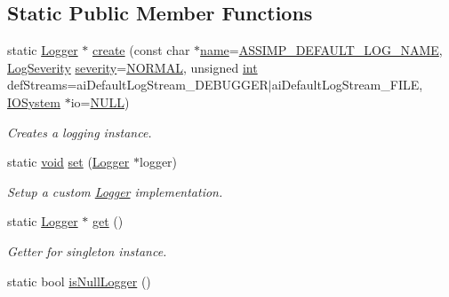 \subsection*{Static Public Member Functions}
\begin{DoxyCompactItemize}
\item 
static \hyperlink{class_assimp_1_1_logger}{Logger} $\ast$ \hyperlink{class_assimp_1_1_default_logger_adccb11f85f8b0ef226c382e11ba665c3}{create} (const char $\ast$\hyperlink{_g_l_e_w_2glew_8h_aaced7cfc21e7d37775d6921bb8177239}{name}=\hyperlink{_default_logger_8hpp_a5e31e6d6c9f8a8954134f3da38fec0a0}{A\-S\-S\-I\-M\-P\-\_\-\-D\-E\-F\-A\-U\-L\-T\-\_\-\-L\-O\-G\-\_\-\-N\-A\-M\-E}, \hyperlink{class_assimp_1_1_logger_a8b6248a0fd062431e8572556350d29e6}{Log\-Severity} \hyperlink{_g_l_e_w_2glew_8h_aa9ef9fc6186ec914a859436da4764bca}{severity}=\hyperlink{class_assimp_1_1_logger_a8b6248a0fd062431e8572556350d29e6a79d16f85dc21486ee489f300027e8eda}{N\-O\-R\-M\-A\-L}, unsigned \hyperlink{_s_d_l__thread_8h_a6a64f9be4433e4de6e2f2f548cf3c08e}{int} def\-Streams=ai\-Default\-Log\-Stream\-\_\-\-D\-E\-B\-U\-G\-G\-E\-R$|$ai\-Default\-Log\-Stream\-\_\-\-F\-I\-L\-E, \hyperlink{class_assimp_1_1_i_o_system}{I\-O\-System} $\ast$io=\hyperlink{begin__code_8h_a070d2ce7b6bb7e5c05602aa8c308d0c4}{N\-U\-L\-L})
\begin{DoxyCompactList}\small\item\em Creates a logging instance. \end{DoxyCompactList}\item 
static \hyperlink{_s_d_l__opengl_8h_a3db05964a3cc4410f35b7ea2b7eb850d}{void} \hyperlink{class_assimp_1_1_default_logger_a9daba548026045b99813c760c2842ed2}{set} (\hyperlink{class_assimp_1_1_logger}{Logger} $\ast$logger)
\begin{DoxyCompactList}\small\item\em Setup a custom \hyperlink{class_assimp_1_1_logger_a784e6d1a741072b17bab32a6a41055e8}{Logger} implementation. \end{DoxyCompactList}\item 
static \hyperlink{class_assimp_1_1_logger}{Logger} $\ast$ \hyperlink{class_assimp_1_1_default_logger_a7d0a53f2db66945ade30094330a77ba4}{get} ()
\begin{DoxyCompactList}\small\item\em Getter for singleton instance. \end{DoxyCompactList}\item 
static bool \hyperlink{class_assimp_1_1_default_logger_abebc7ee702a2a2dde765e771948400c6}{is\-Null\-Logger} ()

\end{DoxyCompactItemize}
